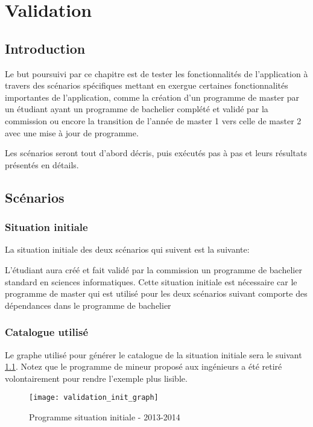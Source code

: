 \chapter{Validation}
\label{validation}
\section{Introduction}
\label{introduction_val}
Le but poursuivi par ce chapitre est de tester les fonctionnalités de l'application à travers des scénarios spécifiques mettant en exergue certaines fonctionnalités importantes de l'application, comme la création d'un programme de master par un étudiant ayant un programme de bachelier complété et validé par la commission ou encore la transition de l'année de master 1 vers celle de master 2 avec une mise à jour de programme. 

Les scénarios seront tout d'abord décris, puis exécutés pas à pas et leurs résultats présentés en détails. 

\section{Scénarios}
\subsection{Situation initiale}
La situation initiale des deux scénarios qui suivent est la suivante:

L'étudiant aura créé et fait validé par la commission un programme de bachelier standard en sciences informatiques. Cette situation initiale est nécessaire car le programme de master qui est utilisé pour les deux scénarios suivant comporte des dépendances dans le programme de bachelier

\subsection{Catalogue utilisé}
Le graphe utilisé pour générer le catalogue de la situation initiale sera le suivant \ref{fig:situation_initiale}. Notez que le programme de mineur proposé aux ingénieurs a été retiré volontairement pour rendre l'exemple plus lisible.
\begin{figure}
\centering
\caption{Programme situation initiale - 2013-2014}
\label{fig:situation_initiale}
\texttt{[image: validation\_init\_graph]}
\end{figure}

